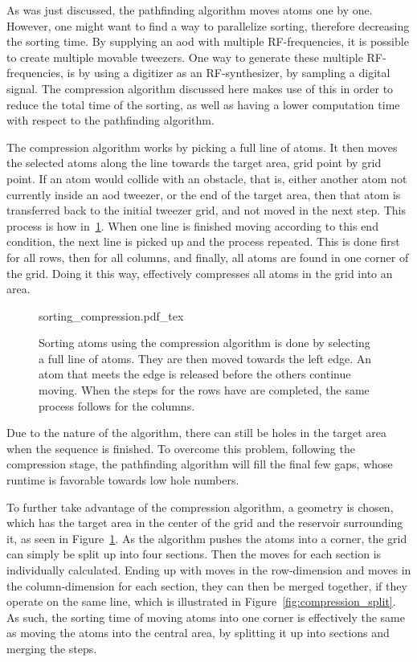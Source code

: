 As was just discussed, the pathfinding algorithm moves atoms one by one. However, one might want to find a way to parallelize sorting, therefore decreasing the sorting time. By supplying an \ac{aod} with multiple RF-frequencies, it is possible to create multiple movable tweezers. One way to generate these multiple RF-frequencies, is by using a digitizer as an RF-synthesizer, by sampling a digital signal. The compression algorithm discussed here makes use of this in order to reduce the total time of the sorting, as well as having a lower computation time with respect to the pathfinding algorithm.

The compression algorithm works by picking a full line of atoms. It then moves the selected atoms along the line towards the target area, grid point by grid point. If an atom would collide with an obstacle, that is, either another atom not currently inside an \ac{aod} tweezer, or the end of the target area, then that atom is transferred back to the initial tweezer grid, and not moved in the next step. This process is how in~\ref{fig:sorting_compression}. When one line is finished moving according to this end condition, the next line is picked up and the process repeated. This is done first for all rows, then for all columns, and finally, all atoms are found in one corner of the grid. Doing it this way, effectively compresses all atoms in the grid into an area.

\begin{figure}[ht]%
\centering
{sorting_compression.pdf_tex}
\caption{Sorting atoms using the compression algorithm is done by selecting a full line of atoms. They are then moved towards the left edge. An atom that meets the edge is released before the others continue moving. When the steps for the rows have are completed, the same process follows for the columns.}%
\label{fig:sorting_compression}
\end{figure}

Due to the nature of the algorithm, there can still be holes in the target area when the sequence is finished. To overcome this problem, following the compression stage, the pathfinding algorithm will fill the final few gaps, whose runtime is favorable towards low hole numbers.

To further take advantage of the compression algorithm, a geometry is chosen, which has the target area in the center of the grid and the reservoir surrounding it, as seen in Figure~\ref{fig:sorting_compression}. As the algorithm pushes the atoms into a corner, the grid can simply be split up into four sections. Then the moves for each section is individually calculated. Ending up with moves in the row-dimension and moves in the column-dimension for each section, they can then be merged together, if they operate on the same line, which is illustrated in Figure~\ref{fig:compression_split}. As such, the sorting time of moving atoms into one corner is effectively the same as moving the atoms into the central area, by splitting it up into sections and merging the steps.

